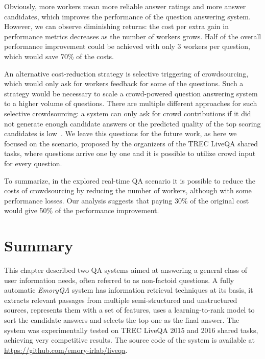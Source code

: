 Obviously, more workers mean more reliable answer ratings and more answer candidates, which improves the performance of the question answering system.
However, we can observe diminishing returns: the cost per extra gain in performance metrics decreases as the number of workers grows.
Half of the overall performance improvement could be achieved with only 3 workers per question, which would save 70\% of the costs.

An alternative cost-reduction strategy is selective triggering of crowdsourcing, which would only ask for workers feedback for some of the questions.
Such a strategy would be necessary to scale a crowd-powered question answering system to a higher volume of questions.
There are multiple different approaches for such selective crowdsourcing: \eg a system can only ask for crowd contributions if it did not generate enough candidate answers or the predicted quality of the top scoring candidates is low~\cite{carmel2010estimating,he2006query}.
We leave this questions for the future work, as here we focused on the scenario, proposed by the organizers of the TREC LiveQA shared tasks, where questions arrive one by one and it is possible to utilize crowd input for every question.

To summarize, in the explored real-time QA scenario it is possible to reduce the costs of crowdsourcing by reducing the number of workers, although with some performance losses.
Our analysis suggests that paying 30\% of the original cost would give 50\% of the performance improvement.


\section{Summary}
\label{section:non-factoid:summary}

This chapter described two QA systems aimed at answering a general class of user information needs, often referred to as non-factoid questions.
A fully automatic \textit{EmoryQA} system has information retrieval techniques at its basis, \ie it extracts relevant passages from multiple semi-structured and unstructured sources, represents them with a set of features, uses a learning-to-rank model to sort the candidate answers and selects the top one as the final answer.
The system was experimentally tested on TREC LiveQA 2015 and 2016 shared tasks, achieving very competitive results.
The source code of the system is available at \href{url}{https://github.com/emory-irlab/liveqa}.

